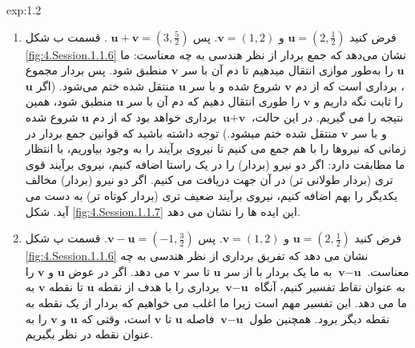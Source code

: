 {\begin{spacing}{1.5}
\begin{example}{exp:1.2}
\begin{enumerate}[label=\textbf{\arabic*}.]
                \item {فرض کنید $\textbf{u}=(2,\frac{\displaystyle 1}{\displaystyle 2})$ و $\textbf{v}=(1,2)$. پس $\textbf{u}+\textbf{v}=(3,\frac{\displaystyle 5}{\displaystyle 2})$ .
                قسمت ب شکل \ref{fig:4.Session.1.1.6} نشان می‌دهد که جمع بردار از نظر هندسی به چه معناست:
                ما $\textbf{u}$ را به‌طور موازی انتقال میدهیم تا دم آن با سر $\textbf{v}$ منطبق شود.
                پس بردار مجموع ، برداری است که از دم $\textbf{v}$ شروع شده و با سر $\textbf{u}$ منتقل شده ختم می‌شود.
                    (اگر $\textbf{u}$ را ثابت نگه داریم و $\textbf{v}$ را طوری انتقال دهیم که دم آن با سر $\textbf{u}$ منطبق شود، همین نتیجه را می گیریم.
                    در این حالت، $\textbf{u}+\textbf{v}$ برداری خواهد بود که از دم $\textbf{u}$ شروع شده و با سر $\textbf{v}$ منتقل شده ختم میشود.)
                    توجه داشته باشید که قوانین جمع بردار در زمانی که نیروها را با هم جمع می کنیم تا نیروی برآیند را به وجود بیاوریم، با انتظار ما مطابقت دارد:
                    اگر دو نیرو (بردار) را در یک راستا اضافه کنیم، نیروی برآیند قوی تری (بردار طولانی تر) در آن جهت دریافت می کنیم.
                    اگر دو نیرو (بردار) مخالف یکدیگر را بهم اضافه کنیم، نیروی برآیند ضعیف تری (بردار کوتاه تر) به دست می آید.
                    شکل \ref{fig:4.Session.1.1.7} این ایده ها را نشان می دهد.}\\

                \item {فرض کنید $\textbf{u}=(2,\frac{\displaystyle 1}{\displaystyle 2})$ و $\textbf{v}=(1,2)$. پس $\textbf{v}-\textbf{u}=(-1,\frac{\displaystyle 3}{\displaystyle 2})$.
                قسمت پ شکل \ref{fig:4.Session.1.1.6} نشان می دهد که تفریق برداری از نظر هندسی به چه معناست.
                    $\textbf{v}-\textbf{u}$ به ما یک بردار با از سر $\textbf{u}$ تا سر $\textbf{v}$ می دهد.
                    اگر در عوض $\textbf{u}$ و $\textbf{v}$ را به عنوان نقاط تفسیر کنیم، آنگاه $\textbf{v}-\textbf{u}$ برداری را با هدف از نقطه $\textbf{u}$ تا نقطه $\textbf{v}$ به ما می دهد.
                    این تفسیر مهم است زیرا ما اغلب می خواهیم که بردار از یک نقطه به نقطه دیگر برود.
                    همچنین طول $\textbf{v}-\textbf{u}$ فاصله $\textbf{u}$ تا $\textbf{v}$ است، وقتی که $\textbf{u}$ و $\textbf{v}$ را به عنوان نقطه در نظر بگیریم.}
            \end{enumerate}


\end{example}
\end{spacing}}
